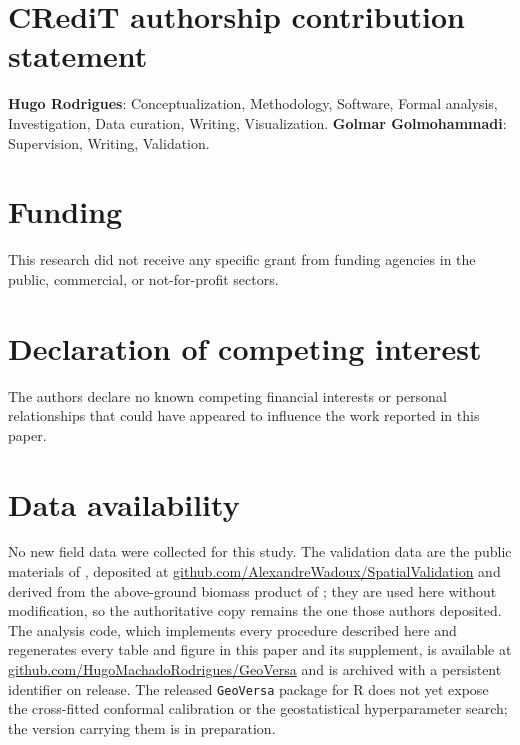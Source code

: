 \documentclass[preprint,12pt,authoryear]{elsarticle}
\begin{document}
\section*{CRediT authorship contribution statement}

\textbf{Hugo Rodrigues}: Conceptualization, Methodology, Software, Formal
analysis, Investigation, Data curation, Writing, Visualization.
\textbf{Golmar Golmohammadi}: Supervision, Writing, Validation.

\section*{Funding}

This research did not receive any specific grant from funding agencies in the
public, commercial, or not-for-profit sectors.

\section*{Declaration of competing interest}

The authors declare no known competing financial interests or personal
relationships that could have appeared to influence the work reported in this
paper.

\section*{Data availability}

No new field data were collected for this study. The validation data are the
public materials of \citet{wadoux2021}, deposited at
\url{github.com/AlexandreWadoux/SpatialValidation} and derived from the
above-ground biomass product of \citet{baccini2012}; they are used here without
modification, so the authoritative copy remains the one those authors deposited.
The analysis code, which implements every procedure described here and
regenerates every table and figure in this paper and its supplement, is
available at \url{github.com/HugoMachadoRodrigues/GeoVersa} and is archived with
a persistent identifier on release. The released \texttt{GeoVersa} package for R
does not yet expose the cross-fitted conformal calibration or the geostatistical
hyperparameter search; the version carrying them is in preparation.



\end{document}
